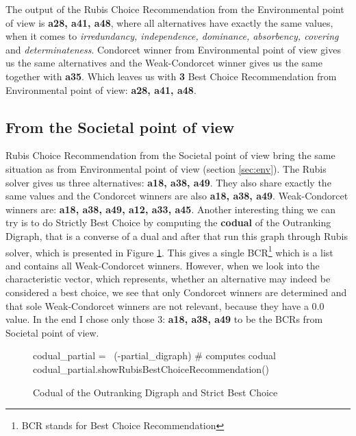 \documentclass[a4paper]{article}
\begin{document}
The output of the Rubis Choice Recommendation from the Environmental point of view is \textbf{a28, a41, a48}, where all alternatives have exactly the same values, when it comes to \emph{irredundancy, independence, dominance, absorbency, covering} and \emph{determinateness}. Condorcet winner from Environmental point of view gives us the same alternatives and the Weak-Condorcet winner gives us the same together with \textbf{a35}. Which leaves us with \textbf{3} Best Choice Recommendation from Environmental point of view: \textbf{a28, a41, a48}.

\subsection{From the Societal point of view}

Rubis Choice Recommendation from the Societal point of view bring the same situation as from Environmental point of view (section \ref*{sec:env}). The Rubis solver gives us three alternatives: \textbf{a18, a38, a49}. They also share exactly the same values and the Condorcet winners are also \textbf{a18, a38, a49}. Weak-Condorcet winners are: \textbf{a18, a38, a49, a12, a33, a45}. Another interesting thing we can try is to do Strictly Best Choice by computing the \textbf{codual} of the Outranking Digraph, that is a converse of a dual and after that run this graph through Rubis solver, which is presented in Figure \ref{lst:strict}. This gives a single BCR\footnote{BCR stands for Best Choice Recommendation} which is a list and contains all Weak-Condorcet winners. However, when we look into the characteristic vector, which represents, whether an alternative may indeed be considered a best choice, we see that only Condorcet winners are determined and that sole Weak-Condorcet winners are not relevant, because they have a 0.0 value. In the end I chose only those 3: \textbf{a18, a38, a49} to be the BCRs from Societal point of view. 

\begin{figure}[H]
	\begin{center}
		\begin{python}
codual_partial = ~(-partial_digraph)                  # computes codual
codual_partial.showRubisBestChoiceRecommendation()
		\end{python}
	\end{center}
	\caption{Codual of the Outranking Digraph and Strict Best Choice}
	\label{lst:strict}
\end{figure}
\end{document}
